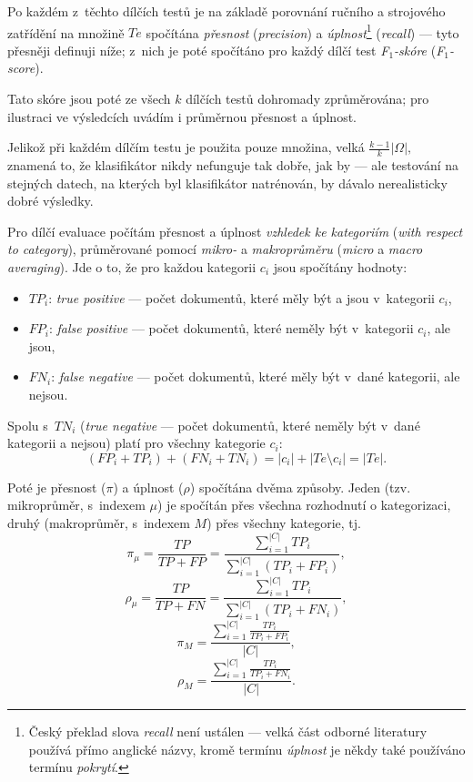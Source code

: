 \documentclass[12pt,a4paper]{report}
\begin{document}
Po každém z~těchto dílčích testů je na základě porovnání ručního a strojového zatřídění na množině $Te$ spočítána \emph{přesnost} (\emph{precision}) a \emph{úplnost}\footnote{Český překlad slova \emph{recall} není ustálen --- velká část odborné literatury používá přímo anglické názvy, kromě termínu \emph{úplnost} je někdy také používáno termínu \emph{pokrytí}.} (\emph{recall}) --- tyto přesněji definuji níže; z~nich je poté spočítáno pro každý dílčí test \emph{F$_1$-skóre} (\emph{F$_1$-score}). 

Tato skóre jsou poté ze všech $k$ dílčích testů dohromady zprůměrována; pro ilustraci ve výsledcích uvádím i průměrnou přesnost a úplnost.

Jelikož při každém dílčím testu je použita pouze množina, velká $\frac{k-1}{k}\left|\Omega\right|,$ znamená to, že klasifikátor nikdy nefunguje tak dobře, jak by  --- ale testování na stejných datech, na kterých byl klasifikátor natrénován, by dávalo nerealisticky dobré výsledky.

Pro dílčí evaluace počítám přesnost a úplnost \emph{vzhledek ke kategoriím} (\emph{with respect to category}), průměrované pomocí \emph{mikro-} a \emph{makroprůměru} (\emph{micro} a \emph{macro averaging}). Jde o to, že pro každou kategorii $c_i$ jsou spočítány hodnoty:
\begin{itemize}
\item  $TP_i$: \emph{true positive} --- počet dokumentů, které měly být a jsou v~kategorii $c_i$,
\item $FP_i$: \emph{false positive} --- počet dokumentů, které neměly být v~kategorii $c_i$, ale jsou,
\item $FN_i$: \emph{false negative} --- počet dokumentů, které měly být v~dané kategorii, ale nejsou.
\end{itemize}
Spolu s~$TN_i$ (\emph{true negative} --- počet dokumentů, které neměly být v~dané kategorii a nejsou) platí pro všechny kategorie $c_i$:
 $$\left(FP_i+TP_i\right)+\left(FN_i+TN_i\right) = \left|c_i\right| + \left|Te \setminus c_i\right| = \left|Te\right|.$$

Poté je přesnost ($\pi$) a úplnost ($\rho$) spočítána dvěma způsoby. Jeden (tzv. mikroprůměr, s~indexem $\mu$) je spočítán přes všechna rozhodnutí o kategorizaci, druhý (makroprůměr, s~indexem $M$) přes všechny kategorie, tj. 
$$\pi_{\mu} = \frac{TP}{TP+FP} = \frac{\sum_{i=1}^{\left|C\right|}TP_i}{\sum_{i=1}^{\left|C\right|}\left(TP_i+FP_i\right)},$$ 
$$\rho_{\mu} = \frac{TP}{TP+FN} = \frac{\sum_{i=1}^{\left|C\right|}TP_i}{\sum_{i=1}^{\left|C\right|}\left(TP_i+FN_i\right)},$$ 
$$\pi_{M} = \frac{\sum_{i=1}^{\left|C\right|}\frac{TP_i}{TP_i+FP_i}}{\left|C\right|},$$ 
$$\rho_{M} = \frac{\sum_{i=1}^{\left|C\right|}\frac{TP_i}{TP_i+FN_i}}{\left|C\right|}.$$
\end{document}

